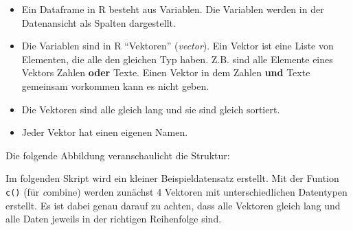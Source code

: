 \documentclass[
]{book}
\providecommand{\tightlist}{%
  \setlength{\itemsep}{0pt}\setlength{\parskip}{0pt}}
\begin{document}
\begin{itemize}
\tightlist
\item
  Ein Dataframe in R besteht aus Variablen. Die Variablen werden in der Datenansicht als Spalten dargestellt.
\item
  Die Variablen sind in R ``Vektoren'' (\emph{vector}). Ein Vektor ist eine Liste von Elementen, die alle den gleichen Typ haben. Z.B. sind alle Elemente eines Vektors Zahlen \textbf{oder} Texte. Einen Vektor in dem Zahlen \textbf{und} Texte gemeinsam vorkommen kann es nicht geben.
\item
  Die Vektoren sind alle gleich lang und sie sind gleich sortiert.
\item
  Jeder Vektor hat einen eigenen Namen.
\end{itemize}

Die folgende Abbildung veranschaulicht die Struktur:

Im folgenden Skript wird ein kleiner Beispieldatensatz erstellt. Mit der Funtion \texttt{c()} (für \emph{c}ombine) werden zunächst 4 Vektoren mit unterschiedlichen Datentypen erstellt. Es ist dabei genau darauf zu achten, dass alle Vektoren gleich lang und alle Daten jeweils in der richtigen Reihenfolge sind.
\end{document}
